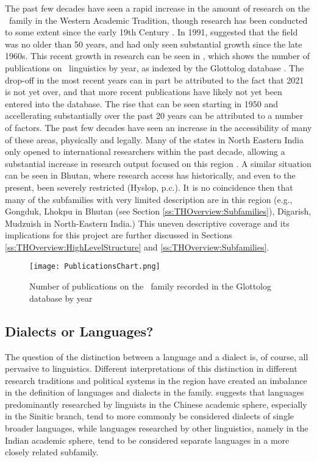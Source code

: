 The past few decades have seen a rapid increase in the amount of research on the \lfam\ family in the Western Academic Tradition, though research has been conducted to some extent since the early 19th Century \cite{VanDriem2014}. In 1991,  suggested that the field was no older than 50 years, and had only seen substantial growth since the late 1960s. This recent growth in research can be seen in , which shows the number of publications on \lfam\ linguistics by year, as indexed by the Glottolog database \cite{glottolog}. The drop-off in the most recent years can in part be attributed to the fact that 2021 is not yet over, and that more recent publications have likely not yet been entered into the database. The rise that can be seen starting in 1950 and accellerating substantially over the past 20 years can be attributed to a number of factors. The past few decades have seen an increase in the accessibility of many of these areas, physically and legally. Many of the states in North Eastern India only opened to international researchers within the past decade, allowing a substantial increase in research output focused on this region \cite{BlenchPost2013}. A similar situation can be seen in Bhutan, where research access has historically, and even to the present, been severely restricted (Hyslop, p.c.). It is no coincidence then that many of the subfamilies with very limited description are in this region (e.g., Gongduk, Lhokpu in Bhutan (see Section \ref{ss:THOverview:Subfamilies}), Digarish, Mudzuish in North-Eastern India.) This uneven descriptive coverage and its implications for this project are further discussed in Sections \ref{ss:THOverview:HighLevelStructure} and \ref{ss:THOverview:Subfamilies}.



\begin{figure}

\centering
\texttt{[image: PublicationsChart.png]}
\caption{Number of publications on the \lfam\ family recorded in the Glottolog database by year \cite{glottolog}}
\label{fig:PublicationsChart}
\end{figure}




\subsection{Dialects or Languages?}\label{s:DialectsorLanguages}
The question of the distinction between a language and a dialect is, of course, all pervasive to linguistics. Different interpretations of this distinction in different research traditions and political systems in the region have created an imbalance in the definition of languages and dialects in the family.  suggests that languages predominantly researched by linguists in the Chinese academic sphere, especially in the Sinitic branch, tend to more commonly be considered dialects of single broader languages, while languages researched by other linguistics, namely in the Indian academic sphere, tend to be considered separate languages in a more closely related subfamily.


